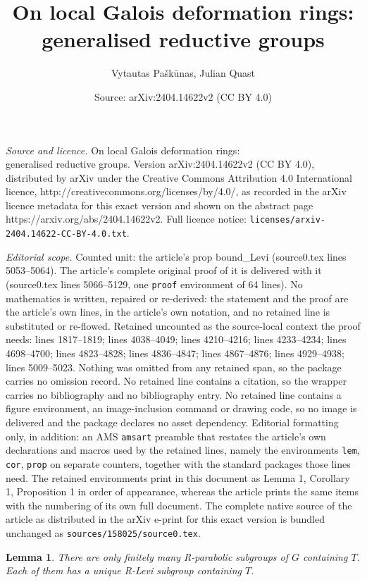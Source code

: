 \documentclass[10pt,a4paper]{amsart}
\title{On local Galois deformation rings:\\ generalised reductive groups}
\author{Vytautas Pa\v{s}k\=unas, Julian Quast}
\date{Source: arXiv:2404.14622v2 (CC BY 4.0)}
\newtheorem{lem}{Lemma}
\begin{document}
\maketitle

\noindent\emph{Source and licence.} On local Galois deformation rings:\\ generalised reductive groups. Version arXiv:2404.14622v2 (CC BY 4.0), distributed by arXiv under the Creative Commons Attribution 4.0 International licence, http://creativecommons.org/licenses/by/4.0/, as recorded in the arXiv licence metadata for this exact version and shown on the abstract page https://arxiv.org/abs/2404.14622v2. Full licence notice: \texttt{licenses/arxiv-2404.14622-CC-BY-4.0.txt}.\par\smallskip

\noindent\textit{Editorial scope.} Counted unit: the article's prop bound\_Levi (source0.tex lines 5053--5064). The article's complete original proof of it is delivered with it (source0.tex lines 5066--5129, one \texttt{proof} environment of 64 lines). No mathematics is written, repaired or re-derived: the statement and the proof are the article's own lines, in the article's own notation, and no retained line is substituted or re-flowed.  Retained uncounted as the source-local context the proof needs: lines 1817--1819; lines 4038--4049; lines 4210--4216; lines 4233--4234; lines 4698--4700; lines 4823--4828; lines 4836--4847; lines 4867--4876; lines 4929--4938; lines 5009--5023.  Nothing was omitted from any retained span, so the package carries no omission record.  No retained line contains a citation, so the wrapper carries no bibliography and no bibliography entry.  No retained line contains a figure environment, an image-inclusion command or drawing code, so no image is delivered and the package declares no asset dependency.  Editorial formatting only, in addition: an AMS \texttt{amsart} preamble that restates the article's own declarations and macros used by the retained lines, namely the environments \texttt{lem}, \texttt{cor}, \texttt{prop} on separate counters, together with the standard packages those lines need.  The retained environments print in this document as Lemma 1, Corollary 1, Proposition 1 in order of appearance, whereas the article prints the same items with the numbering of its own full document.  The complete native source of the article as distributed in the arXiv e-print for this exact version is bundled unchanged as \texttt{sources/158025/source0.tex}.
\begin{lem}\label{Rlevi} There are only finitely many R-parabolic subgroups of $G$ containing $T$. Each of them has a unique R-Levi subgroup 
containing $T$. 
\end{lem} 
\end{document}
